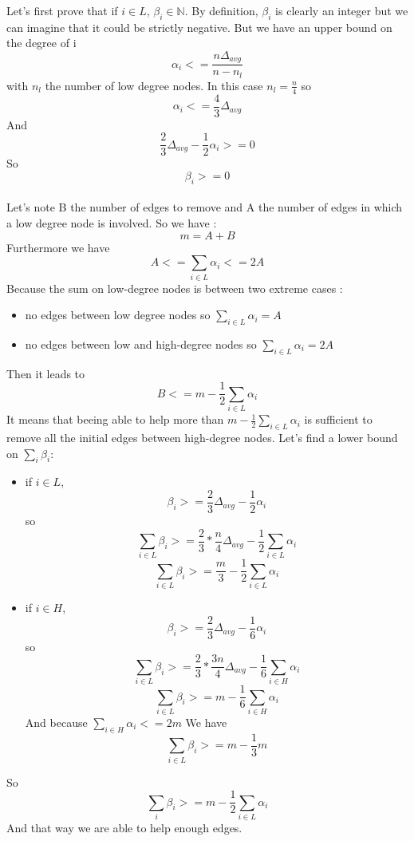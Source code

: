 \documentclass{article}
\begin{document}
Let's first prove that if $i \in L$, $\beta_i \in \mathbb{N}$.
By definition, $\beta_i$ is clearly an integer but we can imagine that
it could be strictly negative. But we have an upper bound on the degree of i
$$\alpha_i <= \frac{n\Delta_{avg}}{n-n_l}$$
with $n_l$ the number of low degree nodes. In this case $n_l = \frac{n}{4}$
so
$$\alpha_i <= \frac{4}{3}\Delta_{avg}$$
And
$$\frac{2}{3}\Delta_{avg}-\frac{1}{2}\alpha_i >= 0$$
So $$\beta_i >= 0$$\\
Let's note B the number of edges to remove and A the number of edges in
which a low degree node is involved. So we have :
$$m = A + B$$
Furthermore we have
$$A <= \sum_{i \in L}\alpha_i <= 2A$$
Because the sum on low-degree nodes is between two extreme cases :
\begin{itemize}
  \item no edges between low degree nodes so $\sum_{i \in L}\alpha_i = A$
  \item no edges between low and high-degree nodes so $\sum_{i \in L}\alpha_i = 2A$
\end{itemize}
Then it leads to
$$B <= m - \frac{1}{2}\sum_{i \in L}\alpha_i$$
It means that beeing able to help more than $m - \frac{1}{2}\sum_{i \in L}\alpha_i$
is sufficient to remove all the initial edges between high-degree nodes.
Let's find a lower bound on $\sum_{i}\beta_i$:
\begin{itemize}
  \item if $i \in L$,
  $$\beta_i >= \frac{2}{3}\Delta_{avg}-\frac{1}{2}\alpha_i$$
  so
  $$\sum_{i \in L}\beta_i >= \frac{2}{3}*\frac{n}{4}\Delta_{avg} - \frac{1}{2}\sum_{i \in L}\alpha_i$$
  $$\sum_{i \in L}\beta_i >= \frac{m}{3} - \frac{1}{2}\sum_{i \in L}\alpha_i$$
  \item if $i \in H$,
  $$\beta_i >= \frac{2}{3}\Delta_{avg}-\frac{1}{6}\alpha_i$$
  so
  $$\sum_{i \in L}\beta_i >= \frac{2}{3}*\frac{3n}{4}\Delta_{avg} - \frac{1}{6}\sum_{i \in H}\alpha_i$$
  $$\sum_{i \in L}\beta_i >= m - \frac{1}{6}\sum_{i \in H}\alpha_i$$
  And because $\sum_{i \in H}\alpha_i <= 2m$
  We have
  $$\sum_{i \in L}\beta_i >= m - \frac{1}{3}m$$
\end{itemize}
So
$$\sum_{i}\beta_i >= m - \frac{1}{2}\sum_{i \in L}\alpha_i$$
And that way we are able to help enough edges.

\newpage
\end{document}
